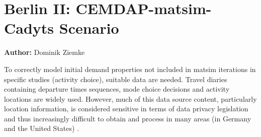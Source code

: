 \section{Berlin II: CEMDAP-\protect\gls{matsim}-Cadyts Scenario}
\label{sec:berlinII}
\hfill \textbf{Author:} Dominik Ziemke


%
To correctly model initial demand properties not included in \gls{matsim} iterations in specific studies (\ie activity choice), suitable data are needed. Travel diaries containing departure times sequences, mode choice decisions and activity locations are widely used.
%
However, much of this data source content, particularly location information, is considered sensitive in terms of data privacy legislation and thus increasingly difficult to obtain and process in many areas (\eg in Germany and the United States) \citep{ZiemkeNagelBhat2015IntegratingCemdapMatsimTransferabilityTRB}.

